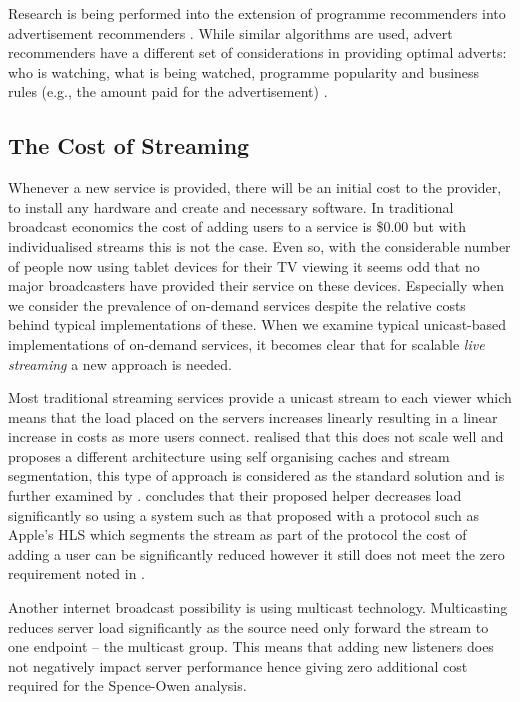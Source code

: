 	Research is being performed into the extension of programme recommenders into advertisement recommenders \citep{contextual_advertising}. While similar algorithms are used, advert recommenders have a different set of considerations in providing optimal adverts: who is watching, what is being watched, programme popularity and business rules (e.g., the amount paid for the advertisement) \citep{contextual_advertising}.

\subsection{The Cost of Streaming}
Whenever a new service is provided, there will be an initial cost to the provider, to install any hardware and create and necessary software. In traditional broadcast economics \citep{broadcastEconomics} the cost of adding users to a service is \$0.00 but with individualised streams this is not the case. Even so, with the considerable number of people now using tablet devices for their TV viewing it seems odd that no major broadcasters have provided their service on these devices. Especially when we consider the prevalence of on-demand services despite the relative costs behind typical implementations of these. When we examine typical unicast-based implementations of on-demand services, it becomes clear that for scalable \textit{live streaming} a new approach is needed.

Most traditional streaming services provide a unicast stream to each viewer which means that the load placed on the servers increases linearly resulting in a linear increase in costs as more users connect. \citet{cachedStream} realised that this does not scale well and proposes a different architecture using self organising caches and stream segmentation, this type of approach is considered as the standard solution and is further examined by \citet{segmentProxyCaching}. \citet{cachedStream} concludes that their proposed helper decreases load significantly so using a system such as that proposed with a protocol such as Apple's HLS\cite{HLS} which segments the stream as part of the protocol the cost of adding a user can be significantly reduced however it still does not meet the zero requirement noted in \citep{broadcastEconomics}.

Another internet broadcast possibility is using multicast technology\citep{multicast}. Multicasting reduces server load significantly as the source need only forward the stream to one endpoint -- the multicast group. This means that adding new listeners does not negatively impact server performance hence giving zero additional cost required for the Spence-Owen analysis\citep{broadcastEconomics}.

